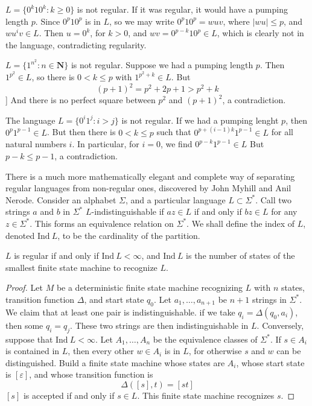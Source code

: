 \begin{example}
    $L = \{ 0^k10^k : k \geq 0 \}$ is not regular. If it was regular, it would have a pumping length $p$. Since $0^p10^p$ is in $L$, so we may write $0^p10^p = wuv$, where $|wu| \leq p$, and $wu^iv \in L$. Then $u = 0^k$, for $k > 0$, and $wv = 0^{p-k}10^p \in L$, which is clearly not in the language, contradicting regularity.
\end{example}

\begin{example}
    $L = \{ 1^{n^2} : n \in \mathbf{N} \}$ is not regular. Suppose we had a pumping length $p$. Then $1^{p^2} \in L$, so there is $0 < k \leq p$ with $1^{p^2 + k} \in L$. But
    \[ (p + 1)^2 = p^2 + 2p + 1 > p^2 + k \]]
    And there is no perfect square between $p^2$ and $(p+1)^2$, a contradiction.
\end{example}

\begin{example}
    The language $L = \{ 0^i1^j : i > j  \}$ is not regular. If we had a pumping lenght $p$, then $0^p1^{p-1} \in L$. But then there is $0 < k \leq p$ such that $0^{p + (i - 1)k}1^{p-1} \in L$ for all natural numbers $i$. In particular, for $i = 0$, we find $0^{p - k}1^{p-1} \in L$ But $p - k \leq p -1$, a contradiction.
\end{example}

There is a much more mathematically elegant and complete way of separating regular languages from non-regular ones, discovered by John Myhill and Anil Nerode. Consider an alphabet $\Sigma$, and a particular language $L \subset \Sigma^*$. Call two strings $a$ and $b$ in $\Sigma^*$ $L$-indistinguishable if $az \in L$ if and only if $bz \in L$ for any $z \in \Sigma^*$. This forms an equivalence relation on $\Sigma^*$. We shall define the index of $L$, denoted $\text{Ind}\ L$, to be the cardinality of the partition.

\begin{theorem}
    $L$ is regular if and only if $\text{Ind}\ L < \infty$, and $\text{Ind}\ L$ is the number of states of the smallest finite state machine to recognize $L$.
\end{theorem}
\begin{proof}
    Let $M$ be a deterministic finite state machine recognizing $L$ with $n$ states, transition function $\Delta$, and start state $q_0$. Let $a_1, \dots, a_{n+1}$ be $n + 1$ strings in $\Sigma^*$. We claim that at least one pair is indistinguishable. if we take $q_i = \Delta(q_0, a_i)$, then some $q_i = q_j$. These two strings are then indistinguishable in $L$. Conversely, suppose that $\text{Ind}\ L < \infty$. Let $A_1, \dots, A_n$ be the equivalence classes of $\Sigma^*$. If $s \in A_i$ is contained in $L$, then every other $w \in A_i$ is in $L$, for otherwise $s$ and $w$ can be distinguished. Build a finite state machine whose states are $A_i$, whose start state is $[\varepsilon]$, and whose transition function is
    \[ \Delta([s], t) = [st] \]
    $[s]$ is accepted if and only if $s \in L$. This finite state machine recognizes $s$.
\end{proof}

